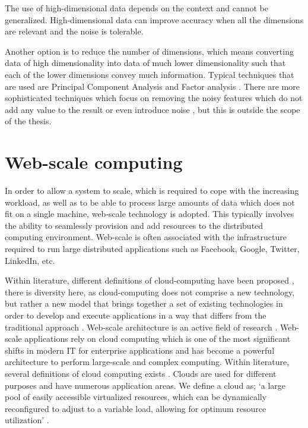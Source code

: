 The use of high-dimensional data depends on the context and cannot be generalized. High-dimensional data can improve accuracy when all the dimensions are relevant and the noise is tolerable.

Another option is to reduce the number of dimensions, which means converting data of high dimensionality into data of much lower dimensionality such that each of the lower dimensions convey much information. Typical techniques that are used are Principal Component Analysis and Factor analysis \cite{citeulike:5467879}. There are more sophisticated techniques which focus on removing the noisy features which do not add any value to the result or even introduce noise \cite{ca37f828023c4aa290d8c6f9f809cab2}, but this is outside the scope of the thesis.

\section{Web-scale computing \label{sec2:webscale}}

In order to allow a system to scale, which is required to cope with the increasing workload, as well as to be able to process large amounts of data which does not fit on a single machine, web-scale technology is adopted. This typically involves the ability to seamlessly provision and add resources to the distributed computing environment. Web-scale is often associated with the infrastructure required to run large distributed applications such as Facebook, Google, Twitter, LinkedIn, etc. 

Within literature, different definitions of cloud-computing have been proposed \cite{clouddef}, there is diversity here, as cloud-computing does not comprise a new technology, but rather a new model that brings together a set of existing technologies in order to develop and execute applications in a way that differs from the traditional approach \cite{zhang:cloud}. Web-scale architecture is an active field of research \cite{cherniack2003scalable}. Web-scale applications rely on cloud computing which is one of the most significant shifts in modern IT for enterprise applications and has become a powerful architecture to perform large-scale and complex computing. Within literature, several definitions of cloud computing exists \cite{sathyavani}. Clouds are used for different purposes and have numerous application areas. We define a cloud as; `a large pool of easily accessible virtualized resources, which can be dynamically reconfigured to adjust to a variable load, allowing for optimum resource utilization' \cite{Vaquero:2008:BCT:1496091.1496100}. 

